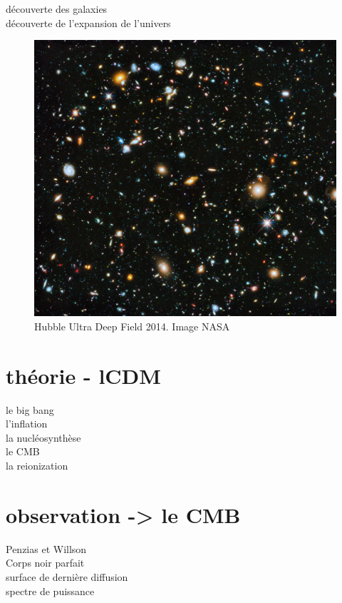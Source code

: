 découverte des galaxies\\
découverte de l'expansion de l'univers

\begin{figure}[bth]
        \includegraphics[width=.95\linewidth]{img/01/hudf.jpeg} 
        \caption{Hubble Ultra Deep Field 2014. 
        Image NASA}
 		\label{fig:cmb}
\end{figure}

\section{théorie - lCDM}

le big bang\\
l'inflation\\
la nucléosynthèse\\
le CMB\\
la reionization


\section{observation -> le CMB}

Penzias et Willson\\
Corps noir parfait\\
surface de dernière diffusion\\
spectre de puissance\\



